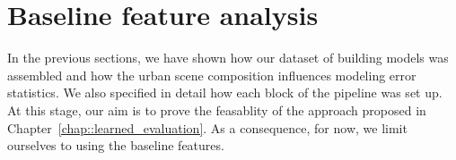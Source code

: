 
\section{Baseline feature analysis}
    \label{sec::experiments::baseline_feature_analysis}
    In the previous sections, we have shown how our dataset of building models was assembled and how the urban scene composition influences modeling error statistics.
    We also specified in detail how each block of the pipeline was set up.
    At this stage, our aim is to prove the feasablity of the approach proposed in Chapter~\ref{chap::learned_evaluation}.
    As a consequence, for now, we limit ourselves to using the baseline features.\\

